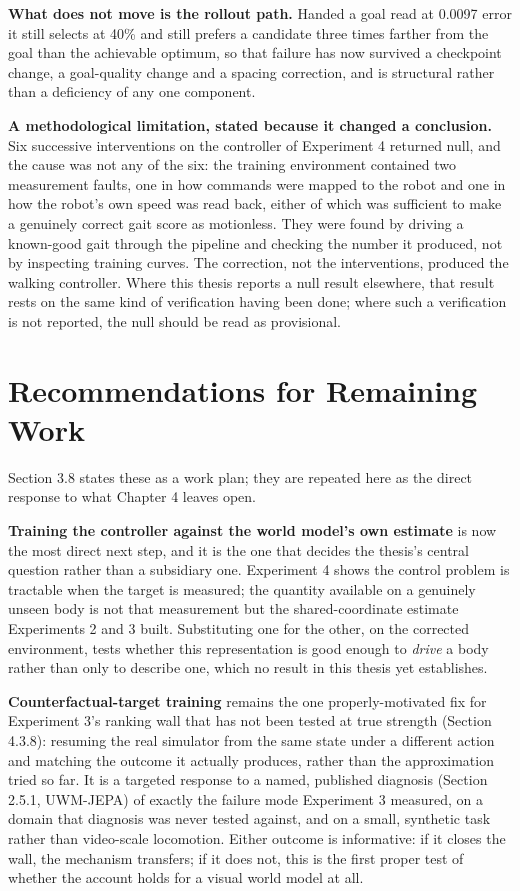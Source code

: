 \documentclass[12pt,a4paper,oneside]{report}
\begin{document}
\noindent\textbf{What does not move is the rollout path.} Handed a goal read at 0.0097 error it still selects at
40\% and still prefers a candidate three times farther from the goal than the achievable optimum, so that failure
has now survived a checkpoint change, a goal-quality change and a spacing correction, and is structural rather
than a deficiency of any one component.

\noindent\textbf{A methodological limitation, stated because it changed a conclusion.} Six successive
interventions on the controller of Experiment 4 returned null, and the cause was not any of the six: the training
environment contained two measurement faults, one in how commands were mapped to the robot and one in how the
robot's own speed was read back, either of which was sufficient to make a genuinely correct gait score as
motionless. They were found by driving a known-good gait through the pipeline and checking the number it produced,
not by inspecting training curves. The correction, not the interventions, produced the walking controller. Where
this thesis reports a null result elsewhere, that result rests on the same kind of verification having been done;
where such a verification is not reported, the null should be read as provisional.

\section{Recommendations for Remaining Work}
Section 3.8 states these as a work plan; they are repeated here as the direct response to what Chapter 4 leaves
open.

\textbf{Training the controller against the world model's own estimate} is now the most direct next step, and it
is the one that decides the thesis's central question rather than a subsidiary one. Experiment 4 shows the control
problem is tractable when the target is measured; the quantity available on a genuinely unseen body is not that
measurement but the shared-coordinate estimate Experiments 2 and 3 built. Substituting one for the other, on the
corrected environment, tests whether this representation is good enough to \emph{drive} a body rather than only to
describe one, which no result in this thesis yet establishes.

\textbf{Counterfactual-target training} remains the one properly-motivated fix for Experiment 3's ranking wall that
has not been tested at true strength (Section 4.3.8): resuming the real simulator from the same state under a
different action and matching the outcome it actually produces, rather than the approximation tried so far. It is
a targeted response to a named, published diagnosis (Section 2.5.1, UWM-JEPA) of exactly the failure mode
Experiment 3 measured, on a domain that diagnosis was never tested against, and on a small, synthetic task rather
than video-scale locomotion. Either outcome is informative: if it closes the wall, the mechanism transfers; if it
does not, this is the first proper test of whether the account holds for a visual world model at all.
\end{document}
